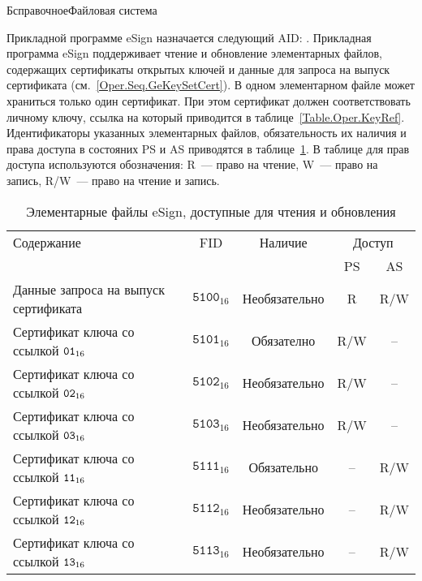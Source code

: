 \begin{appendix}{Б}{справочное}{Файловая система}

Прикладной программе eSign назначается следующий AID: 
. 
%
Прикладная программа eSign поддерживает чтение и обновление 
элементарных файлов, содержащих сертификаты открытых ключей и данные для
запроса на выпуск сертификата (см.~\ref{Oper.Seq.GeKeySetCert}). 
В одном элементарном файле может храниться только один
сертификат. При этом сертификат должен
соответствовать личному ключу, ссылка на который приводится
в таблице~\ref{Table.Oper.KeyRef}.
Идентификаторы указанных элементарных файлов, обязательность
их наличия и права доступа в состояних PS и AS
приводятся в таблице~\ref{Table.FILES.EFSIGN}.
В таблице для прав доступа используются обозначения: 
R~--- право на чтение, W~--- право на запись,
R/W~--- право на чтение и запись.
 
\begin{table}[H]
\caption{Элементарные файлы eSign, доступные для чтения и обновления}
\label{Table.FILES.EFSIGN}
\begin{tabular}{|l|c|c|c|c|}
\hline
Содержание & FID & Наличие & \multicolumn{2}{|c|}{Доступ}\\
\cline{4-5}
& & & PS & AS \\
\hline
\hline
Данные запроса на выпуск сертификата & 
$\texttt{5100}_{16}$ & Необязательно &  R & R/W \\
Сертификат ключа со ссылкой $\texttt{01}_{16}$ & 
$\texttt{5101}_{16}$ & Обязателно & R/W & -- \\
Сертификат ключа со ссылкой $\texttt{02}_{16}$ & 
$\texttt{5102}_{16}$ & Необязательно & R/W & -- \\
Сертификат ключа со ссылкой $\texttt{03}_{16}$ & 
$\texttt{5103}_{16}$ & Необязательно & R/W & -- \\
Сертификат ключа со ссылкой $\texttt{11}_{16}$ & 
$\texttt{5111}_{16}$ & Обязательно & -- & R/W \\
Сертификат ключа со ссылкой $\texttt{12}_{16}$ & 
$\texttt{5112}_{16}$ & Необязательно &  -- & R/W \\
Сертификат ключа со ссылкой $\texttt{13}_{16}$ & 
$\texttt{5113}_{16}$ & Необязательно & -- & R/W \\
\hline
\end{tabular}
\end{table}

\mbox{}
\vfill
\mbox{}
\clearpage


\end{appendix}